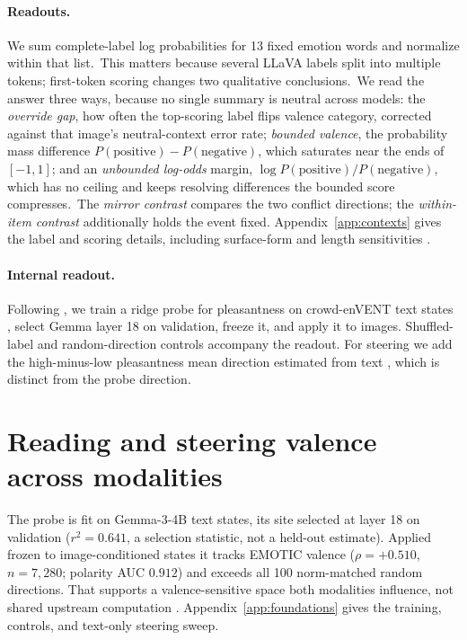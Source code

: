 \documentclass{article}
\newif\ifshort
\newcommand{\gemma}{Gemma-3-4B}
\begin{document}
\paragraph{Readouts.}
We sum complete-label log probabilities for 13 fixed emotion words and normalize within that list.\ifshort\else\ This matters because several LLaVA labels split into multiple tokens; first-token scoring changes two qualitative conclusions.\fi\ We read the answer three ways, because no single summary is neutral across models: \ifshort(i) a neutral-baseline-corrected categorical override gap, (ii) bounded valence $P(\text{positive})-P(\text{negative})$, and (iii) unbounded positive-versus-negative log-odds.\else the \emph{override gap}, how often the top-scoring label flips valence category, corrected against that image's neutral-context error rate; \emph{bounded valence}, the probability mass difference $P(\text{positive})-P(\text{negative})$, which saturates near the ends of $[-1,1]$; and an \emph{unbounded log-odds} margin, $\log P(\text{positive})/P(\text{negative})$, which has no ceiling and keeps resolving differences the bounded score compresses.\fi\ The \emph{mirror contrast} compares the two conflict directions; the \emph{within-item contrast} additionally holds the event fixed. Appendix~\ref{app:contexts} gives the label and scoring details, including surface-form and length sensitivities \citep{holtzman2021, brown2020}.

\paragraph{Internal readout.}
Following \citet{tak2025}, we train a ridge probe for pleasantness on crowd-enVENT text states \citep{troiano2023}, select Gemma layer 18 on validation, freeze it, and apply it to images. Shuffled-label and random-direction controls accompany the readout. For steering we add the high-minus-low pleasantness mean direction estimated from text \citep{turner2023, rimsky2024}, which is distinct from the probe direction.

\ifshort
\section{Reading and steering valence across modalities}
\label{sec:foundations}

The probe is fit on \gemma{} text states, its site selected at layer 18 on validation ($r^2=0.641$, a selection statistic, not a held-out estimate). Applied frozen to image-conditioned states it tracks EMOTIC valence ($\rho=+0.510$, $n=7{,}280$; polarity AUC $0.912$) and exceeds all 100 norm-matched random directions. That supports a valence-sensitive space both modalities influence, not shared upstream computation \citep{nikankin2025}. Appendix~\ref{app:foundations} gives the training, controls, and text-only steering sweep.
\end{document}
